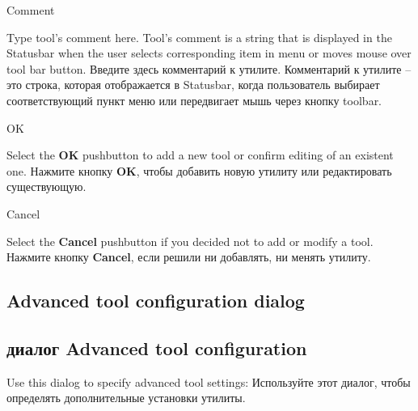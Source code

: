 \begin{popup}
\caption{Comment}

\ifenglish
Type tool's comment here. Tool's comment is a string that is displayed in the
Statusbar when the user selects corresponding item in menu or moves mouse over
tool bar button.
 \else
Введите здесь комментарий к утилите. Комментарий к утилите -- это строка, которая
отображается в Statusbar, когда пользователь выбирает соответствующий пункт меню
или передвигает мышь через кнопку toolbar.
\fi
\end{popup}

\begin{popup}
\caption{OK}

\ifenglish
Select the {\bf OK} pushbutton to add a new tool or confirm editing
of an existent one.
 \else
Нажмите кнопку {\bf OK}, чтобы добавить новую утилиту или редактировать
существующую.
\fi
\end{popup}

\begin{popup}
\caption{Cancel}

\ifenglish
Select the {\bf Cancel} pushbutton if you decided not to add or modify
a tool.
 \else
Нажмите кнопку {\bf Cancel}, если решили ни добавлять, ни менять утилиту.
\fi
\end{popup}


\ifenglish
\subsection{Advanced tool configuration dialog}
 \else
\subsection{диалог Advanced tool configuration}
\fi
{}
\nominitoc

\ifenglish
Use this dialog to specify advanced tool settings:
 \else
Используйте этот диалог, чтобы определять дополнительные установки утилиты.
\fi
{}


